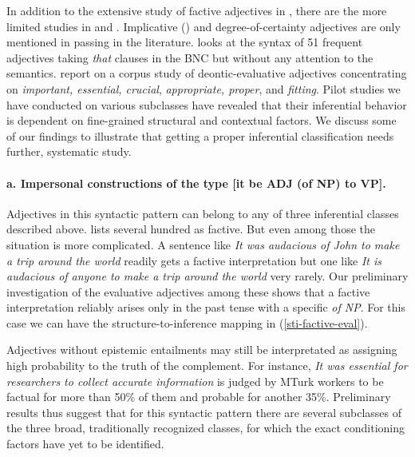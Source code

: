 \documentclass[10pt]{article}
\begin{document}
In addition to the extensive study of factive adjectives in \cite{norrick:1978},
there are the more limited studies in \cite{wilkinson:1970} and \cite{barker:2002}. Implicative (\cite{karttunen:1971}) and degree-of-certainty adjectives are only mentioned in passing in the literature. \cite{mindt:2011} looks at the syntax of 51 frequent adjectives taking \emph{that }clauses in the BNC but without any attention to the semantics. \cite{vanlinden+davidse:2009} report on a corpus study of deontic-evaluative adjectives concentrating on \emph{important, essential, crucial}, \emph{appropriate, proper}, and \emph{fitting}.
Pilot studies we have conducted on various subclasses have revealed  that their inferential behavior is dependent on fine-grained structural and contextual factors. We discuss some of our findings to illustrate that getting a proper inferential classification  needs further, systematic study.

\vspace{-.2in}
\paragraph{a. Impersonal constructions of the type [it be ADJ (of NP) to VP].}
 Adjectives in this syntactic pattern can belong to any of three inferential classes described above. 
\cite{norrick:1978} lists several hundred as factive. But even among those 
the situation is more complicated. A sentence like \textit{It was audacious of John to make a trip around the world} readily gets a factive interpretation but one like \textit{It is audacious of anyone to make a trip around the world} very rarely. Our preliminary investigation of the evaluative adjectives among these shows that a factive interpretation reliably arises only in the past tense with a specific \textit{of NP}. For this case we can have the structure-to-inference mapping in (\ref{sti-factive-eval}).

\vspace{-0.5em}
\vspace{-0.5em}

Adjectives without epistemic entailments may still be interpretated as assigning high probability to the truth of the complement. For instance, \textit{It was essential for researchers to collect accurate information} is judged by MTurk workers to be factual for more than 50\% of them and probable for another 35\%. 
Preliminary results thus suggest that for this syntactic pattern there are several subclasses of the three broad, traditionally recognized classes, for which the exact conditioning factors have yet to be identified.
\end{document}
